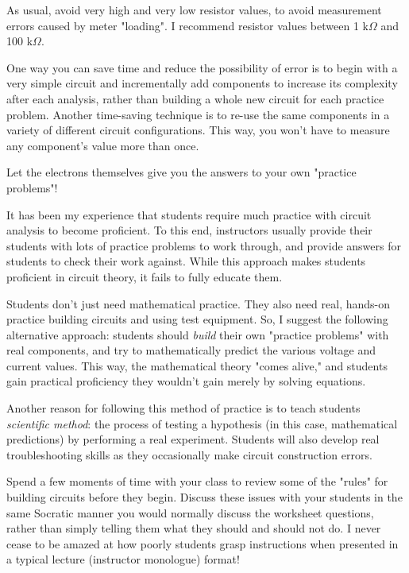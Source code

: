 As usual, avoid very high and very low resistor values, to avoid measurement errors caused by meter "loading".  I recommend resistor values between 1 k$\Omega$ and 100 k$\Omega$.

One way you can save time and reduce the possibility of error is to begin with a very simple circuit and incrementally add components to increase its complexity after each analysis, rather than building a whole new circuit for each practice problem.  Another time-saving technique is to re-use the same components in a variety of different circuit configurations.  This way, you won't have to measure any component's value more than once.







Let the electrons themselves give you the answers to your own "practice problems"!







It has been my experience that students require much practice with circuit analysis to become proficient.  To this end, instructors usually provide their students with lots of practice problems to work through, and provide answers for students to check their work against.  While this approach makes students proficient in circuit theory, it fails to fully educate them.

Students don't just need mathematical practice.  They also need real, hands-on practice building circuits and using test equipment.  So, I suggest the following alternative approach: students should {\it build} their own "practice problems" with real components, and try to mathematically predict the various voltage and current values.  This way, the mathematical theory "comes alive," and students gain practical proficiency they wouldn't gain merely by solving equations.

Another reason for following this method of practice is to teach students {\it scientific method}: the process of testing a hypothesis (in this case, mathematical predictions) by performing a real experiment.  Students will also develop real troubleshooting skills as they occasionally make circuit construction errors.

Spend a few moments of time with your class to review some of the "rules" for building circuits before they begin.  Discuss these issues with your students in the same Socratic manner you would normally discuss the worksheet questions, rather than simply telling them what they should and should not do.  I never cease to be amazed at how poorly students grasp instructions when presented in a typical lecture (instructor monologue) format!

